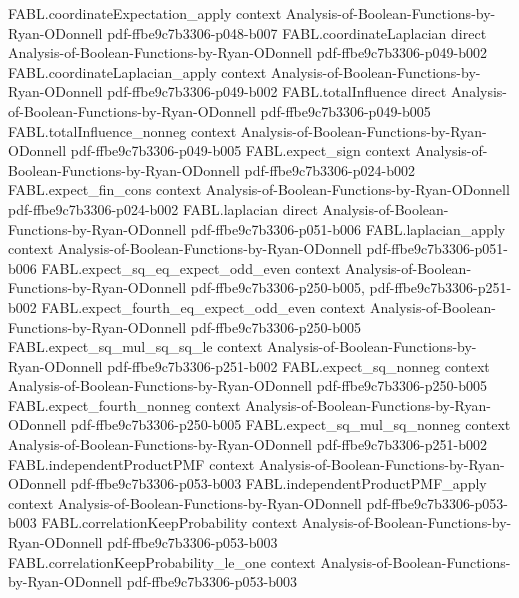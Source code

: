 \begin{theorem}
\proofstep
  {FABL.coordinateExpectation_apply}
  {context}
  {Analysis-of-Boolean-Functions-by-Ryan-ODonnell}
  {pdf-ffbe9c7b3306-p048-b007}
\proofstep
  {FABL.coordinateLaplacian}
  {direct}
  {Analysis-of-Boolean-Functions-by-Ryan-ODonnell}
  {pdf-ffbe9c7b3306-p049-b002}
\proofstep
  {FABL.coordinateLaplacian_apply}
  {context}
  {Analysis-of-Boolean-Functions-by-Ryan-ODonnell}
  {pdf-ffbe9c7b3306-p049-b002}
\proofstep
  {FABL.totalInfluence}
  {direct}
  {Analysis-of-Boolean-Functions-by-Ryan-ODonnell}
  {pdf-ffbe9c7b3306-p049-b005}
\proofstep
  {FABL.totalInfluence_nonneg}
  {context}
  {Analysis-of-Boolean-Functions-by-Ryan-ODonnell}
  {pdf-ffbe9c7b3306-p049-b005}
\proofstep
  {FABL.expect_sign}
  {context}
  {Analysis-of-Boolean-Functions-by-Ryan-ODonnell}
  {pdf-ffbe9c7b3306-p024-b002}
\proofstep
  {FABL.expect_fin_cons}
  {context}
  {Analysis-of-Boolean-Functions-by-Ryan-ODonnell}
  {pdf-ffbe9c7b3306-p024-b002}
\proofstep
  {FABL.laplacian}
  {direct}
  {Analysis-of-Boolean-Functions-by-Ryan-ODonnell}
  {pdf-ffbe9c7b3306-p051-b006}
\proofstep
  {FABL.laplacian_apply}
  {context}
  {Analysis-of-Boolean-Functions-by-Ryan-ODonnell}
  {pdf-ffbe9c7b3306-p051-b006}
\proofstep
  {FABL.expect_sq_eq_expect_odd_even}
  {context}
  {Analysis-of-Boolean-Functions-by-Ryan-ODonnell}
  {pdf-ffbe9c7b3306-p250-b005,
    pdf-ffbe9c7b3306-p251-b002}
\proofstep
  {FABL.expect_fourth_eq_expect_odd_even}
  {context}
  {Analysis-of-Boolean-Functions-by-Ryan-ODonnell}
  {pdf-ffbe9c7b3306-p250-b005}
\proofstep
  {FABL.expect_sq_mul_sq_sq_le}
  {context}
  {Analysis-of-Boolean-Functions-by-Ryan-ODonnell}
  {pdf-ffbe9c7b3306-p251-b002}
\proofstep
  {FABL.expect_sq_nonneg}
  {context}
  {Analysis-of-Boolean-Functions-by-Ryan-ODonnell}
  {pdf-ffbe9c7b3306-p250-b005}
\proofstep
  {FABL.expect_fourth_nonneg}
  {context}
  {Analysis-of-Boolean-Functions-by-Ryan-ODonnell}
  {pdf-ffbe9c7b3306-p250-b005}
\proofstep
  {FABL.expect_sq_mul_sq_nonneg}
  {context}
  {Analysis-of-Boolean-Functions-by-Ryan-ODonnell}
  {pdf-ffbe9c7b3306-p251-b002}
\proofstep
  {FABL.independentProductPMF}
  {context}
  {Analysis-of-Boolean-Functions-by-Ryan-ODonnell}
  {pdf-ffbe9c7b3306-p053-b003}
\proofstep
  {FABL.independentProductPMF_apply}
  {context}
  {Analysis-of-Boolean-Functions-by-Ryan-ODonnell}
  {pdf-ffbe9c7b3306-p053-b003}
\proofstep
  {FABL.correlationKeepProbability}
  {context}
  {Analysis-of-Boolean-Functions-by-Ryan-ODonnell}
  {pdf-ffbe9c7b3306-p053-b003}
\proofstep
  {FABL.correlationKeepProbability_le_one}
  {context}
  {Analysis-of-Boolean-Functions-by-Ryan-ODonnell}
  {pdf-ffbe9c7b3306-p053-b003}

\end{theorem}
